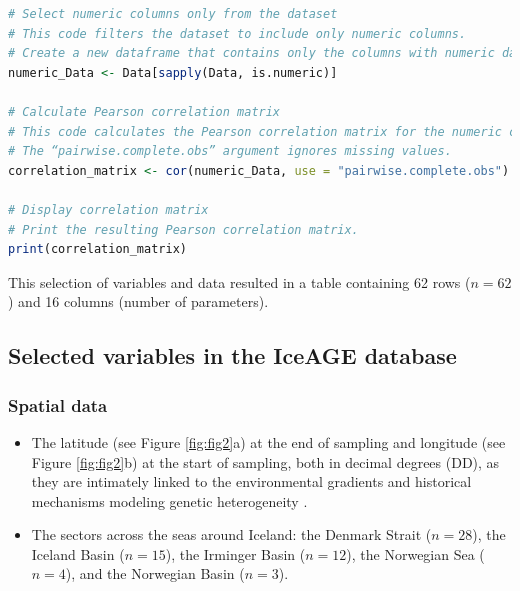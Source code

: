{\begin{lstlisting}[label=lst:pearson,language=R,caption=RStudio script to calculate the Pearson correlation coefficient between all the numerical variables in our final dataset]
# Select numeric columns only from the dataset
# This code filters the dataset to include only numeric columns.
# Create a new dataframe that contains only the columns with numeric data.
numeric_Data <- Data[sapply(Data, is.numeric)]

# Calculate Pearson correlation matrix
# This code calculates the Pearson correlation matrix for the numeric columns.
# The “pairwise.complete.obs” argument ignores missing values.
correlation_matrix <- cor(numeric_Data, use = "pairwise.complete.obs")

# Display correlation matrix
# Print the resulting Pearson correlation matrix.
print(correlation_matrix)
\end{lstlisting}

This selection of variables and data resulted in a table containing 62 rows ($n=62$) and 16 columns (number of parameters).

\subsection{Selected variables in the IceAGE database}

\subsubsection{Spatial data}

\begin{itemize}
\item The latitude (see Figure \ref{fig:fig2}a) at the end of sampling and longitude (see Figure \ref{fig:fig2}b) at the start of sampling, both in decimal degrees (DD), as they are intimately linked to the environmental gradients and historical mechanisms modeling genetic heterogeneity \citep{gaither2013origins}.
\item The sectors across the seas around Iceland: the Denmark Strait ($n=28$), the Iceland Basin ($n=15$), the Irminger Basin ($n=12$), the Norwegian Sea ($n=4$), and the Norwegian Basin ($n=3$).
\end{itemize}

}

